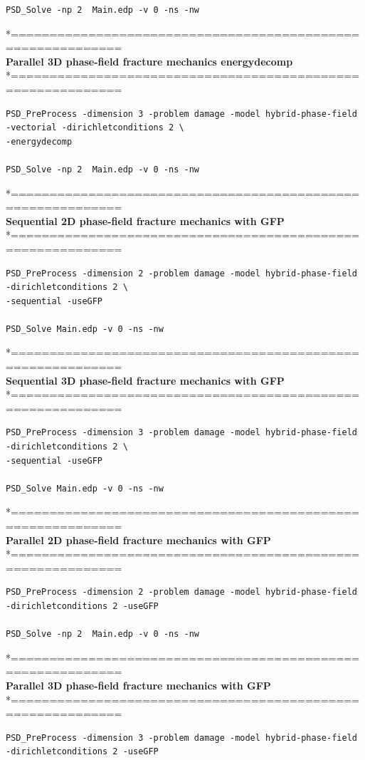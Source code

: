 {{\begin{lstlisting}[style=BashInputStyle]
PSD_Solve -np 2  Main.edp -v 0 -ns -nw   
\end{lstlisting}
*============================================================\\
\textbf{ Parallel 3D phase-field fracture mechanics energydecomp }\\
*============================================================\\
\begin{lstlisting}[style=BashInputStyle]
PSD_PreProcess -dimension 3 -problem damage -model hybrid-phase-field -vectorial -dirichletconditions 2 \
-energydecomp   

PSD_Solve -np 2  Main.edp -v 0 -ns -nw   
\end{lstlisting}
*============================================================\\
\textbf{ Sequential 2D phase-field fracture mechanics with GFP }\\
*============================================================\\
\begin{lstlisting}[style=BashInputStyle]
PSD_PreProcess -dimension 2 -problem damage -model hybrid-phase-field  -dirichletconditions 2 \
-sequential -useGFP   

PSD_Solve Main.edp -v 0 -ns -nw   
\end{lstlisting}
*============================================================\\
\textbf{ Sequential 3D phase-field fracture mechanics with GFP} \\
*============================================================\\
\begin{lstlisting}[style=BashInputStyle]
PSD_PreProcess -dimension 3 -problem damage -model hybrid-phase-field  -dirichletconditions 2 \
-sequential -useGFP   

PSD_Solve Main.edp -v 0 -ns -nw   
\end{lstlisting}
*============================================================\\
\textbf{ Parallel 2D phase-field fracture mechanics with GFP} \\
*============================================================\\
\begin{lstlisting}[style=BashInputStyle]
PSD_PreProcess -dimension 2 -problem damage -model hybrid-phase-field -dirichletconditions 2 -useGFP   

PSD_Solve -np 2  Main.edp -v 0 -ns -nw   
\end{lstlisting}
*============================================================\\
\textbf{ Parallel 3D phase-field fracture mechanics with GFP }\\
*============================================================\\
\begin{lstlisting}[style=BashInputStyle]
PSD_PreProcess -dimension 3 -problem damage -model hybrid-phase-field -dirichletconditions 2 -useGFP   


\end{lstlisting}}}
